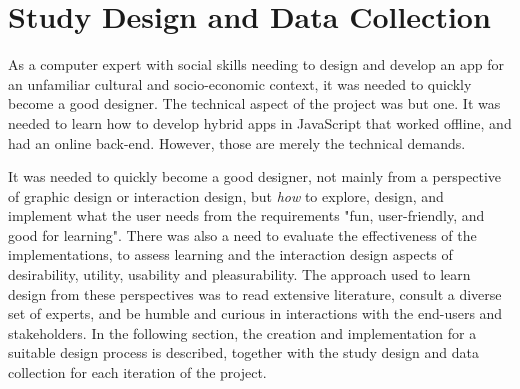 \section{Study Design and Data Collection}

  As a computer expert with social skills needing to design and develop an app for an unfamiliar cultural and socio-economic context, it was needed to quickly become a good designer. The technical aspect of the project was but one. It was needed to learn how to develop hybrid apps in JavaScript that worked offline, and had an online back-end. However, those are merely the technical demands.

  It was needed to quickly become a good designer, not mainly from a perspective of graphic design or interaction design, but \textit{how} to explore, design, and implement what the user needs from the requirements "fun, user-friendly, and good for learning". There was also a need to evaluate the effectiveness of the implementations, to assess learning and the interaction design aspects of desirability, utility, usability and pleasurability. The approach used to learn design from these perspectives was to read extensive literature, consult a diverse set of experts, and be humble and curious in interactions with the end-users and stakeholders. In the following section, the creation and implementation for a suitable design process is described, together with the study design and data collection for each iteration of the project.



%








